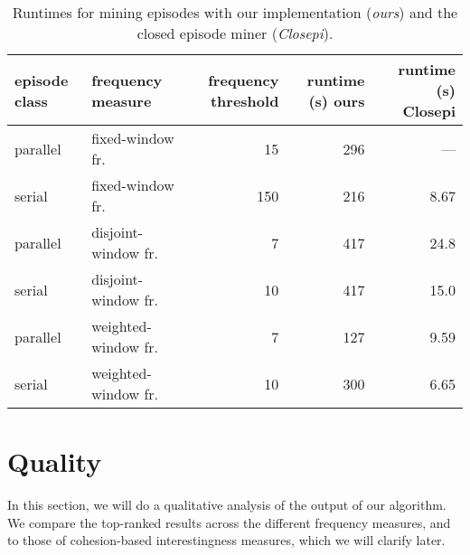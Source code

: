 
\begin{table}
\begin{tabulary}{\textwidth}{L|l|R|R|R}
episode class & frequency measure & frequency threshold & runtime (s) ours & runtime (s) Closepi \\
\hline
parallel & fixed-window fr. & 15 & 296 & --- \\
serial & fixed-window fr. & 150 & 216 & 8.67 \\
parallel & disjoint-window fr. & 7 & 417 & 24.8 \\
serial & disjoint-window fr. & 10 & 417 & 15.0 \\
parallel & weighted-window fr. & 7 & 127 & 9.59 \\
serial & weighted-window fr. & 10 & 300 & 6.65 \\
\end{tabulary}
\caption{Runtimes for mining episodes with our implementation (\emph{ours}) and the closed episode miner (\emph{Closepi}).}
\label{table:closepi-comparison}
\end{table}

\section{Quality}

In this section, we will do a qualitative analysis of the output of our algorithm. We compare the top-ranked results across the different frequency measures, and to those of cohesion-based interestingness measures, which we will clarify later.

\iffalse
\subsection{Comparing the frequency measures on a toy example}

We consider the example sequence of the example in Figure~\ref{fig:event-sequence}, which was used as an example throughout chapter~\ref{sec:problem-statement}. A small sequence is interesting to analyze because we have a full overview of the dataset, and can therefore provide insight into how the frequency and confidence values came to be. Also, it is possible to generate all episodes that cover the sequence for a certain window size, using a low frequency threshold.

We'll generate all episodes using all of the frequency measures we implemented.
\fi


